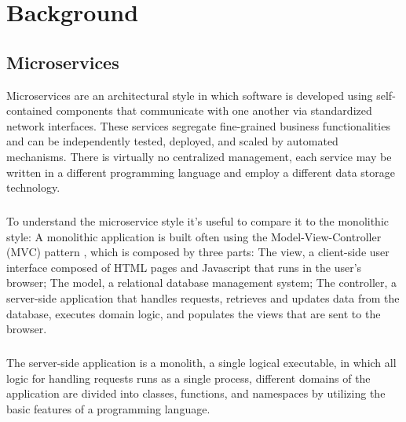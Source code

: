 
%

\chapter{Background}
\label{cha:background}

\section{Microservices} %
\label{sec:microservices}

Microservices \cite{microservices, microservices2017tenets, microservicesTomorrow} are an architectural style in which software is developed using self-contained components that
communicate with one another via standardized network interfaces.
These services segregate fine-grained business functionalities and can be independently tested, deployed, and scaled by automated mechanisms.
There is virtually no centralized management, each service may be written in a different programming language and employ a different data storage technology.

\paragraph{}

To understand the microservice style it's useful to compare it to the monolithic style:
A monolithic application is built often using the Model-View-Controller (MVC) pattern \cite{mvc}, which is composed by three parts:
The view, a client-side user interface composed of HTML pages and Javascript that runs in the user's browser;
The model, a relational database management system;
The controller, a server-side application that handles requests, retrieves and updates data from the database, executes domain logic,
and populates the views that are sent to the browser.

\paragraph{}

The server-side application is a monolith, a single logical executable, in which all logic for handling requests runs as a single process,
different domains of the application are divided into classes, functions, and namespaces by utilizing the basic features of a programming language.

